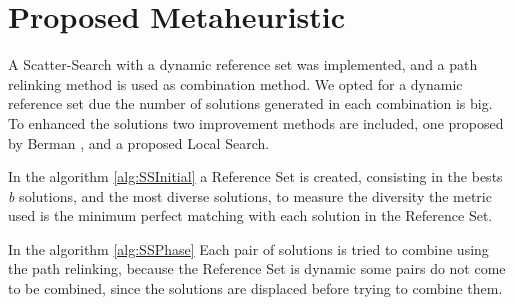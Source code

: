 \section{Proposed Metaheuristic}
A Scatter-Search
with a dynamic reference set
was implemented,
and a path relinking method
is used as combination method.
We opted for a dynamic reference set
due the number of solutions generated
in each combination is big.
To enhanced the solutions
two improvement methods are included,
one proposed by Berman \cite{berman1987stochastic},
and a proposed Local Search.


In the algorithm \ref{alg:SSInitial}
a Reference Set is created,
consisting in the bests \textit{b} solutions,
and the most diverse  solutions,
to measure the diversity
the metric used is
the minimum perfect matching
with each solution in the Reference Set.


In the algorithm \ref{alg:SSPhase}
Each pair  of solutions
is tried to combine
using the path relinking,
because the Reference Set is dynamic
some pairs do not come to be combined,
since the solutions
are displaced
before trying to combine them.
